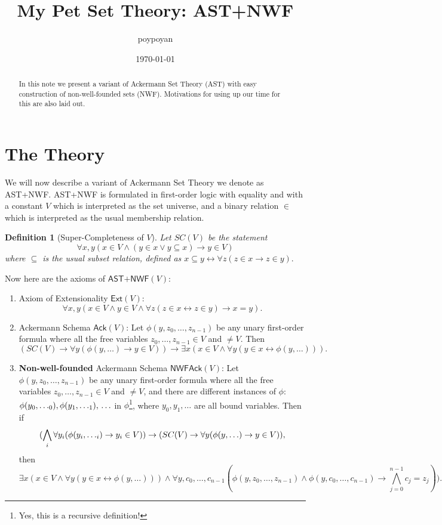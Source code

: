 \documentclass{article}
\title{My Pet Set Theory: \textsf{AST+NWF}}
\author{poypoyan}
\date{\petsa\today}
\newtheorem{definition}{Definition}[section]
\begin{document}
\maketitle

\begin{abstract}
In this note we present a variant of Ackermann Set Theory (AST) with easy construction of non-well-founded sets (NWF). Motivations for using up our time for this are also laid out.
\end{abstract}

\section{The Theory}
We will now describe a variant of Ackermann Set Theory \cite{ackermann} we denote as \textsf{AST+NWF}. \textsf{AST+NWF} is formulated in first-order logic with equality and with a constant $V$ which is interpreted as the set universe, and a binary relation $\in$ which is interpreted as the usual membership relation.

\begin{definition}[Super-Completeness of $V$]
Let $SC(V)$ be the statement $$\forall x, y (x \in V \wedge (y \in x \vee y \subseteq x) \rightarrow y \in V)$$ where $\subseteq$ is the usual subset relation, defined as $x \subseteq y \leftrightarrow \forall z(z \in x \rightarrow z \in y).$
\end{definition}

\noindent Now here are the axioms of $\textsf{AST+NWF}(V)$:

\begin{enumerate}
	\item Axiom of Extensionality $\textsf{Ext}(V)$: $$\forall x, y (x \in V \wedge y \in V \wedge \forall z(z\in x \leftrightarrow z \in y) \rightarrow x = y).$$
	\item Ackermann Schema $\textsf{Ack}(V)$: Let $\phi(y, z_0, \ldots, z_{n-1})$ be any unary first-order formula where all the free variables $z_0, \ldots, z_{n-1} \in V$ and $\ne V$. Then $$(SC(V) \rightarrow \forall y(\phi(y, \ldots) \rightarrow y \in V)) \rightarrow \exists x(x \in V \wedge \forall y(y \in x \leftrightarrow \phi(y, \ldots))).$$
    \item \textbf{Non-well-founded} Ackermann Schema $\textsf{NWFAck}(V)$: Let $\phi(y, z_0, \ldots, z_{n-1})$ be any unary first-order formula where all the free variables $z_0, \ldots, z_{n-1} \in V$ and $\ne V$, and there are different instances of $\phi$: $\phi(y_0, \ldots_0), \phi(y_1, \ldots_1), \\ \ldots$ in $\phi$\footnote{Yes, this is a recursive definition!}, where $y_0, y_1, \ldots$ are all bound variables. Then if
$$(\bigwedge_i \forall y_i( \phi(y_i, \ldots_i) \rightarrow y_i \in V)) \rightarrow \\ (SC(V) \rightarrow \forall y(\phi(y, \ldots) \rightarrow y \in V)),$$
then
$$\exists x(x \in V \wedge \forall y(y \in x \leftrightarrow \phi(y, \ldots))) \wedge \forall y, c_0, \ldots, c_{n-1} (\phi(y, z_0, \ldots, z_{n-1}) \wedge \phi(y, c_0, \ldots, c_{n-1}) \rightarrow \bigwedge_{j=0}^{n-1} {c_j = z_j})).$$
\end{enumerate}
\end{document}
